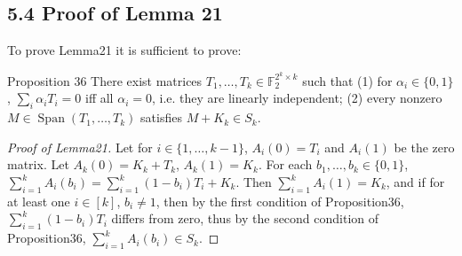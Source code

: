 \subsection*{5.4 Proof of Lemma 21}
To prove Lemma21 it is sufficient to prove:
\begin{authorclaim}{Proposition 36}
There exist matrices $T_1,\ldots,T_k\in\mathbb F_2^{2^k\times k}$ such that (1) for $\alpha_i\in\{0,1\}$, $\sum_i\alpha_iT_i=0$ iff all $\alpha_i=0$, i.e. they are linearly independent; (2) every nonzero $M\in\operatorname{Span}(T_1,\ldots,T_k)$ satisfies $M+K_k\in S_k$.
\end{authorclaim}
\begin{proof}[Proof of Lemma21]
Let for $i\in\{1,\ldots,k-1\}$, $A_i(0)=T_i$ and $A_i(1)$ be the zero matrix. Let $A_k(0)=K_k+T_k$, $A_k(1)=K_k$. For each $b_1,\ldots,b_k\in\{0,1\}$, $\sum_{i=1}^kA_i(b_i)=\sum_{i=1}^k(1-b_i)T_i+K_k$. Then $\sum_{i=1}^kA_i(1)=K_k$, and if for at least one $i\in[k]$, $b_i\ne1$, then by the first condition of Proposition36, $\sum_{i=1}^k(1-b_i)T_i$ differs from zero, thus by the second condition of Proposition36, $\sum_{i=1}^kA_i(b_i)\in S_k$.
\end{proof}
